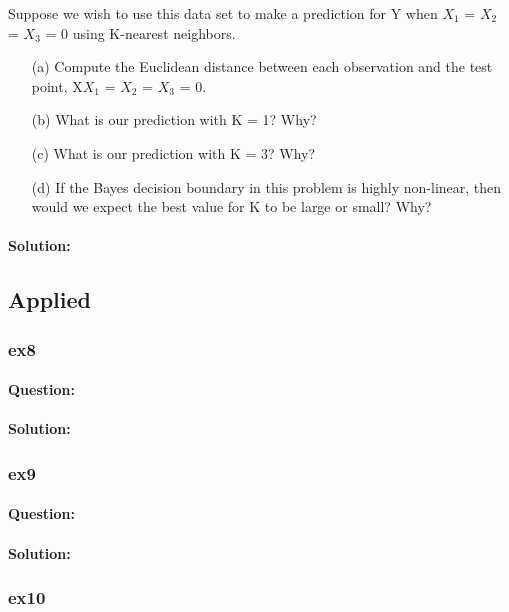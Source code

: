 \documentclass[a4paper,12pt,titlepage]{article} %
\begin{document}
Suppose we wish to use this data set to make a prediction for Y when $X_{1}$ = $X_{2}$ = $X_{3}$ = 0 using K-nearest neighbors.

\begin{itemize}
	\item[(a)] Compute the Euclidean distance between each observation and the test point, X$X_{1}$ = $X_{2}$ = $X_{3}$ = 0.
	\item[(b)] What is our prediction with K = 1? Why?
	\item[(c)] What is our prediction with K = 3? Why?
	\item[(d)] If the Bayes decision boundary in this problem is highly non-linear, then would we expect the best value for K to be large or small? Why?
\end{itemize}
\paragraph{Solution:}


\subsection{Applied}
\subsubsection{ex8}
\paragraph{Question:}

\paragraph{Solution:}

\subsubsection{ex9}
\paragraph{Question:}

\paragraph{Solution:}

\subsubsection{ex10}
\end{document}
